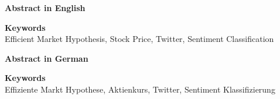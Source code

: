 
\newcommand*{\AbstractHead}[1]{%
{\noindent\color{header-blue}\sffamily\Large\textbf{#1}}
\vspace{10pt}\\
}%

\newcommand*{\SomeSpace}{%
\vspace{\baselineskip}
}

\AbstractHead{Abstract in English}
\noindent
\normalsize
\lipsum[1]

\SomeSpace
\AbstractHead{Keywords}
\normalsize
\noindent
Efficient Market Hypothesis, Stock Price, Twitter, Sentiment Classification

\glsresetall{}
\SomeSpace

\AbstractHead{Abstract in German}
\noindent
\normalsize
\lipsum[1]

\SomeSpace
\AbstractHead{Keywords}
\normalsize
\noindent
Effiziente Markt Hypothese, Aktienkurs, Twitter, Sentiment Klassifizierung

\glsresetall{}
